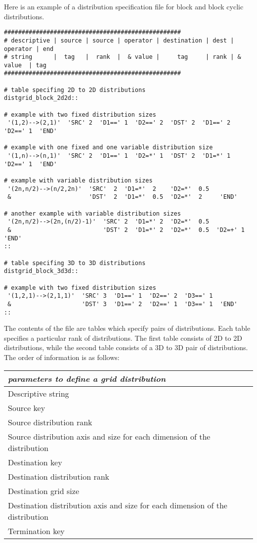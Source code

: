 Here is an example of a distribution specification file for block and block cyclic distributions.
\begin{center}
\begin{verbatim}
##################################################
# descriptive | source | source | operator | destination | dest | operator | end
# string      |  tag   |  rank  |  & value |     tag     | rank | & value  | tag
##################################################

# table specifing 2D to 2D distributions
distgrid_block_2d2d::

# example with two fixed distribution sizes
 '(1,2)-->(2,1)'  'SRC' 2  'D1==' 1  'D2==' 2  'DST' 2  'D1==' 2  'D2==' 1  'END'  

# example with one fixed and one variable distribution size
 '(1,n)-->(n,1)'  'SRC' 2  'D1==' 1  'D2=*' 1  'DST' 2  'D1=*' 1  'D2==' 1  'END'  

# example with variable distribution sizes
 '(2n,n/2)-->(n/2,2n)'  'SRC'  2  'D1=*'  2    'D2=*'  0.5  
 &                      'DST'  2  'D1=*'  0.5  'D2=*'  2     'END'

# another example with variable distribution sizes
 '(2n,n/2)-->(2n,(n/2)-1)'  'SRC' 2  'D1=*' 2  'D2=*'  0.5  
 &                          'DST' 2  'D1=*' 2  'D2=*'  0.5  'D2=+' 1   'END'
::

# table specifing 3D to 3D distributions
distgrid_block_3d3d::

# example with two fixed distribution sizes
 '(1,2,1)-->(2,1,1)'  'SRC' 3  'D1==' 1  'D2==' 2  'D3==' 1  
 &                    'DST' 3  'D1==' 2  'D2==' 1  'D3==' 1  'END'  
::
\end{verbatim}
\end{center}
The contents of the file are tables which specify pairs of distributions. Each table specifies a particular rank of distributions. The first table consists of 2D to 2D distributions, while the second table consists of a 3D to 3D pair of distributions. 
The order of information is as follows:
\begin{center}
\begin{tabular}{| l |} \hline 
{\em parameters to define a grid distribution }  \\
\hline \hline
 Descriptive string    \\
 Source key   \\
 Source distribution rank \\
 Source distribution axis and size for each dimension of the distribution  \\
 Destination key \\
 Destination distribution rank    \\
 Destination grid size \\
 Destination distribution axis and size for each dimension of the distribution  \\
 Termination key \\
\hline 
\end{tabular}
\end{center}
